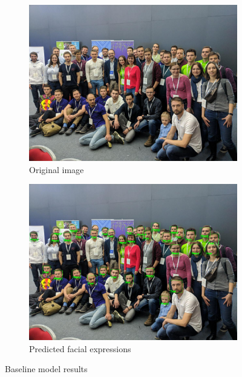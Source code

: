\begin{figure}[h]
	\centering
	\begin{subfigure}[h]{0.65\textwidth}
		\includegraphics[width=\textwidth]{../data/original/test2.jpg}
		\caption{Original image}
	\end{subfigure}\qquad
	\begin{subfigure}[h]{0.65\textwidth}
		\includegraphics[width=\textwidth]{../images/test2_labeled.jpg}
		\caption{Predicted facial expressions}
	\end{subfigure}
	\caption{Baseline model results}
\end{figure}


